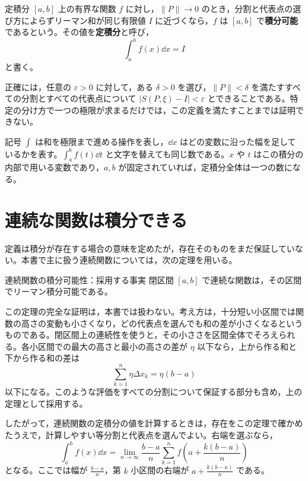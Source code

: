 \begin{definition}{定積分}
$[a,b]$ 上の有界な関数 $f$ に対し，$\|P\|\to0$ のとき，分割と代表点の選び方によらずリーマン和が同じ有限値 $I$ に近づくなら，$f$ は $[a,b]$ で\textbf{積分可能}であるという。その値を\textbf{定積分}と呼び，
\[
 \int_a^b f(x)\dd x=I
\]
と書く。
\end{definition}

正確には，任意の $\varepsilon>0$ に対して，ある $\delta>0$ を選び，$\|P\|<\delta$ を満たすすべての分割とすべての代表点について $|S(P,\xi)-I|<\varepsilon$ とできることである。特定の分け方で一つの極限が求まるだけでは，この定義を満たすことまでは証明できない。

記号 $\int$ は和を極限まで進める操作を表し，$\dd x$ はどの変数に沿った幅を足しているかを表す。$
\int_a^b f(t)\dd t$ と文字を替えても同じ数である。$x$ や $t$ はこの積分の内部で用いる変数であり，$a,b$ が固定されていれば，定積分全体は一つの数になる。

\section{連続な関数は積分できる}\label{節:積分可能性}
定義は積分が存在する場合の意味を定めたが，存在そのものをまだ保証していない。本書で主に扱う連続関数については，次の定理を用いる。

\begin{theorem}{連続関数の積分可能性：採用する事実}\label{定理:連続積分可能}
閉区間 $[a,b]$ で連続な関数は，その区間でリーマン積分可能である。
\end{theorem}

この定理の完全な証明は，本書では扱わない。考え方は，十分短い小区間では関数の高さの変動も小さくなり，どの代表点を選んでも和の差が小さくなるというものである。閉区間上の連続性を使うと，その小ささを区間全体でそろえられる。各小区間での最大の高さと最小の高さの差が $\eta$ 以下なら，上から作る和と下から作る和の差は
\[
 \sum_{k=1}^{n}\eta\Delta x_k=\eta(b-a)
\]
以下になる。このような評価をすべての分割について保証する部分も含め，上の定理として採用する。

したがって，連続関数の定積分の値を計算するときは，存在をこの定理で確かめたうえで，計算しやすい等分割と代表点を選んでよい。右端を選ぶなら，
\[
 \int_a^b f(x)\dd x
 =\lim_{n\to\infty}\frac{b-a}{n}
  \sum_{k=1}^{n}f\left(a+\frac{k(b-a)}n\right)
\]
となる。ここでは幅が $\frac{b-a}{n}$，第 $k$ 小区間の右端が $a+\frac{k(b-a)}n$ である。

